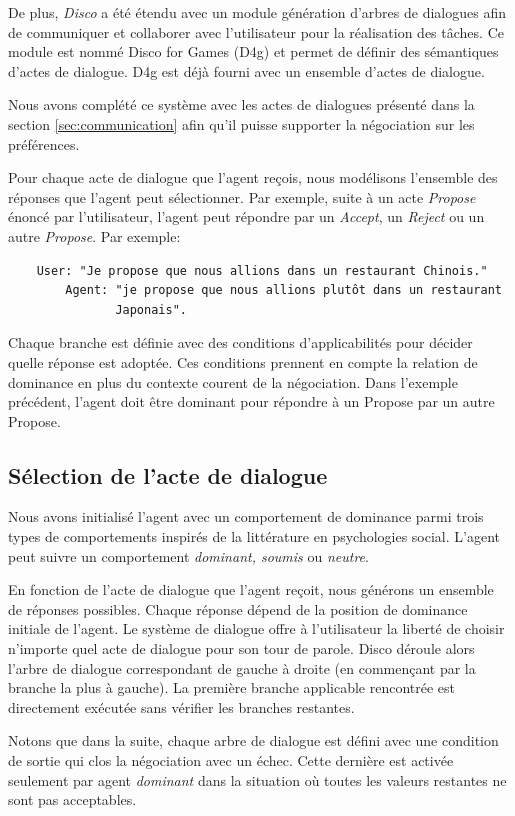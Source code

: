 	De plus, \emph{Disco} a été étendu avec un module génération d'arbres de dialogues afin de communiquer et collaborer avec l'utilisateur pour la réalisation des tâches. Ce module est nommé Disco for Games (D4g) et permet de définir des sémantiques d'actes de dialogue. D4g est déjà fourni avec un ensemble d'actes de dialogue.
	
	Nous avons complété ce système avec les actes de dialogues présenté dans la section \ref{sec:communication} afin qu'il puisse supporter la négociation sur les préférences.
	
	Pour chaque acte de dialogue que l'agent reçois, nous modélisons l'ensemble des réponses que l'agent peut sélectionner. Par exemple, suite à un acte \emph{Propose} énoncé par l'utilisateur, l'agent peut répondre par un \emph{Accept}, un \emph{Reject} ou un autre \emph{Propose}. 
	Par exemple:
	\begin{verbatim}
	User: "Je propose que nous allions dans un restaurant Chinois." 
		Agent: "je propose que nous allions plutôt dans un restaurant
			   Japonais". 
	\end{verbatim}
	Chaque branche est définie avec des conditions d'applicabilités pour décider quelle réponse est adoptée. 
	Ces conditions prennent en compte la relation de  dominance en plus du contexte courent de la négociation. Dans l'exemple précédent, l'agent doit être dominant pour répondre à un Propose par un autre Propose. 
	
	
	\subsection{Sélection de l'acte de dialogue}
	Nous avons initialisé l'agent avec un comportement de dominance parmi trois types de comportements inspirés de la littérature en psychologies social.  L'agent peut suivre un comportement \emph{dominant, soumis} ou \emph{neutre}. 
	
	En fonction de l'acte de dialogue que l'agent reçoit, nous générons un ensemble de réponses possibles. Chaque réponse dépend de la position de dominance initiale de l'agent. Le système de dialogue offre à l'utilisateur la liberté de choisir n'importe quel acte de dialogue pour son tour de parole. Disco déroule alors l'arbre de dialogue correspondant de gauche à droite (en commençant par la branche la plus à gauche). La première branche applicable rencontrée est directement exécutée sans vérifier les branches restantes.
	
	Notons que dans la suite, chaque arbre de dialogue est défini avec une condition de sortie qui clos la négociation avec un échec. Cette dernière est activée seulement par agent \emph{dominant} dans la situation où toutes les valeurs restantes ne sont pas acceptables. 
	
